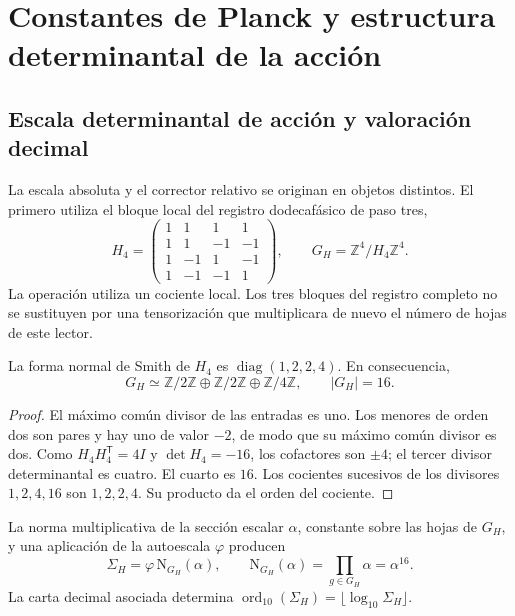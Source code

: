 \section{Constantes de Planck y estructura determinantal de la acción}
\label{sec:action}
\subsection{Escala determinantal de acción y valoración decimal}

La escala absoluta y el corrector relativo se originan en objetos
distintos. El primero utiliza el bloque local del registro dodecafásico
de paso tres,
\begin{equation}
 H_4=\begin{pmatrix}
 1&1&1&1\\1&1&-1&-1\\1&-1&1&-1\\1&-1&-1&1
 \end{pmatrix},\qquad
 G_H=\mathbb Z^4/H_4\mathbb Z^4.
 \label{eq:el-h4}
\end{equation}
La operación utiliza un cociente local. Los tres bloques del registro
completo no se sustituyen por una tensorización que multiplicara de
nuevo el número de hojas de este lector.

\begin{lemma}
La forma normal de Smith de \(H_4\) es
\(\operatorname{diag}(1,2,2,4)\). En consecuencia,
\[
 G_H\simeq\mathbb Z/2\mathbb Z\oplus\mathbb Z/2\mathbb Z
 \oplus\mathbb Z/4\mathbb Z,\qquad |G_H|=16.
\]
\end{lemma}
\begin{proof}
El máximo común divisor de las entradas es uno. Los menores de orden dos
son pares y hay uno de valor \(-2\), de modo que su máximo común divisor
es dos. Como \(H_4H_4^{\mathsf T}=4I\) y \(\det H_4=-16\), los
cofactores son \(\pm4\); el tercer divisor determinantal es cuatro.
El cuarto es \(16\). Los cocientes sucesivos de los divisores
\(1,2,4,16\) son \(1,2,2,4\). Su producto da el orden del cociente.
\end{proof}

\begin{definition}
La norma multiplicativa de la sección escalar \(\alpha\), constante
sobre las hojas de \(G_H\), y una aplicación de la autoescala
\(\varphi\) producen
\begin{equation}
 \Sigma_H=\varphi\,\mathrm N_{G_H}(\alpha),\qquad
 \mathrm N_{G_H}(\alpha)=\prod_{g\in G_H}\alpha=\alpha^{16}.
 \label{eq:el-lector-determinantal}
\end{equation}
La carta decimal asociada determina
\(\operatorname{ord}_{10}(\Sigma_H)=\lfloor\log_{10}\Sigma_H\rfloor\).
\end{definition}

